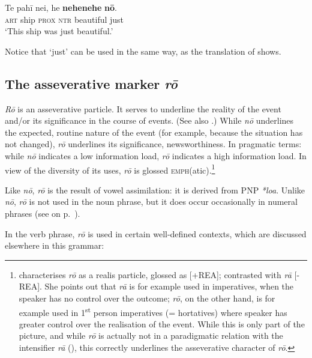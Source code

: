 \ea\label{ex:7.113}
\gll Te pahī nei, he \textbf{nehenehe} \textbf{nō}. \\
\textsc{art} ship \textsc{prox} \textsc{ntr} beautiful just \\

\glt
‘This ship was just beautiful.’ \textstyleExampleref{[R239.022]} 
\z

Notice that  ‘just’ can be used in the same way, as the translation of  shows.

\subsection{The asseverative marker \textit{rō}}\label{sec:7.4.2}
\textit{Rō} is an asseverative particle. It serves to underline the reality of the event and/or its significance in the course of events. (See also \citealt[41]{WeberR2003}.) While \textit{nō} underlines the expected, routine nature of the event (for example, because the situation has not changed), \textit{rō} underlines its significance, newsworthiness. In pragmatic terms: while \textit{nō} indicates a low information load, \textit{rō} indicates a high information load. In view of the diversity of its uses, \textit{rō} is glossed \textsc{emph}(atic).\footnote{\label{fn:348} \citet[37]{DuFeu1996} characterises \textit{rō} as a realis particle, glossed as [+REA]; contrasted with \textit{rā} [-REA]. She points out that \textit{rā} is for example used in imperatives, when the speaker has no control over the outcome; \textit{rō}, on the other hand, is for example used in 1\textsuperscript{st} person imperatives (= hortatives) where speaker has greater control over the realisation of the event. While this is only part of the picture, and while \textit{rō} is actually not in a paradigmatic relation with the intensifier \textit{rā} (), this correctly underlines the asseverative character of \textit{rō}.}

Like \textit{nō}, \textit{rō} is the result of vowel assimilation: it is derived from PNP \textit{*loa}. Unlike \textit{nō}, \textit{rō} is not used in the noun phrase, but it does occur occasionally in numeral phrases (see  on p.~\pageref{ex:4.28}).

In the verb phrase, \textit{rō} is used in certain well-defined contexts, which are discussed elsewhere in this grammar:

